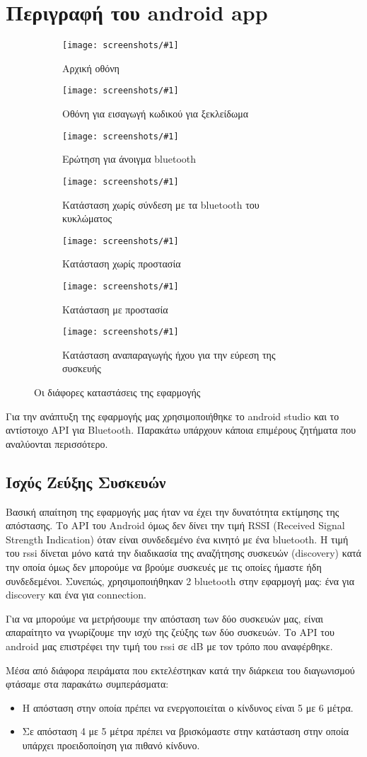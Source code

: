\section{Περιγραφή του android app}
\let\originalfigurename\figurename
\renewcommand{\figurename}{Εικόνα}
\newcommand{\screenshot}[2]{%
\begin{subfigure}{0.5\textwidth}%
\centering%
\texttt{[image: screenshots/\#1]}%
\caption{#2}
\label{fig:#1}%
\end{subfigure}%
}

\begin{figure}[htbp]
        \screenshot{start}{Αρχική οθόνη}%
        \screenshot{locked}{Οθόνη για εισαγωγή κωδικού για ξεκλείδωμα}
        \screenshot{bluetooth-open}{Ερώτηση για άνοιγμα bluetooth}%
        \screenshot{not-connected}{Κατάσταση χωρίς σύνδεση με τα bluetooth του κυκλώματος}
        \screenshot{not-protected}{Κατάσταση χωρίς προστασία}%
        \screenshot{protected}{Κατάσταση με προστασία}
        \screenshot{ring}{Κατάσταση αναπαραγωγής ήχου για την εύρεση της συσκευής}
        \caption{Οι διάφορες καταστάσεις της εφαρμογής}
\end{figure}

Για την ανάπτυξη της εφαρμογής μας χρησιμοποιήθηκε το android studio και το αντίστοιχο API για Bluetooth.
Παρακάτω υπάρχουν κάποια επιμέρους ζητήματα που αναλύονται περισσότερο.

\subsection{Ισχύς Ζεύξης Συσκευών}
Βασική απαίτηση της εφαρμογής μας ήταν να έχει την δυνατότητα εκτίμησης της απόστασης.
Το API του Android όμως δεν δίνει την τιμή RSSI (Received Signal Strength Indication) όταν είναι συνδεδεμένο ένα κινητό με ένα bluetooth.
Η τιμή του rssi δίνεται μόνο κατά την διαδικασία της αναζήτησης συσκευών (discovery) κατά την οποία όμως δεν μπορούμε να βρούμε συσκευές με τις οποίες ήμαστε ήδη συνδεδεμένοι.
Συνεπώς, χρησιμοποιήθηκαν 2 bluetooth στην εφαρμογή μας: ένα για discovery και ένα για connection.

Για να μπορούμε να μετρήσουμε την απόσταση των δύο συσκευών μας, είναι
απαραίτητο να γνωρίζουμε την ισχύ της ζεύξης των δύο συσκευών.
Το API του android μας επιστρέφει την τιμή του rssi σε dB με τον τρόπο που αναφέρθηκε.

Μέσα από διάφορα πειράματα που εκτελέστηκαν κατά την διάρκεια του διαγωνισμού
φτάσαμε στα παρακάτω συμπεράσματα:
\begin{itemize}
\item Η απόσταση στην οποία πρέπει να ενεργοποιείται ο κίνδυνος είναι 5 με 6
μέτρα.
\item Σε απόσταση 4 με 5 μέτρα πρέπει να βρισκόμαστε στην κατάσταση στην οποία
υπάρχει προειδοποίηση για πιθανό κίνδυνο.
\end{itemize}

